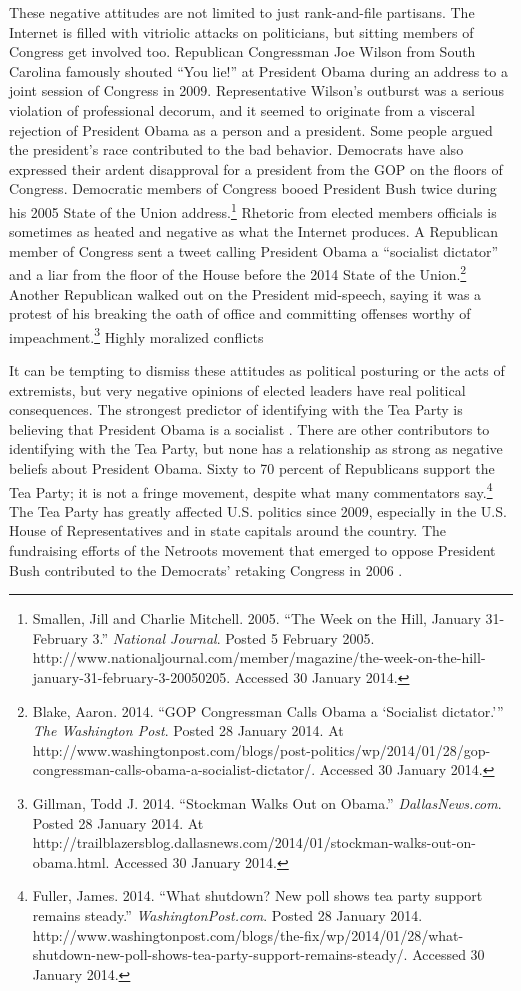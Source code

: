 These negative attitudes are not limited to just rank-and-file partisans. The Internet is filled with vitriolic attacks on politicians, but sitting members of Congress get involved too. Republican Congressman Joe Wilson from South Carolina famously shouted ``You lie!'' at President Obama during an address to a joint session of Congress in 2009. Representative Wilson's outburst was a serious violation of professional decorum, and it seemed to originate from a visceral rejection of President Obama as a person and a president. Some people argued the president's race contributed to the bad behavior. Democrats have also expressed their ardent disapproval for a president from the GOP on the floors of Congress. Democratic members of Congress booed President Bush twice during his 2005 State of the Union address.\footnote{Smallen, Jill and Charlie Mitchell. 2005. ``The Week on the Hill, January 31-February 3.'' \emph{National Journal}. Posted 5 February 2005. http://www.nationaljournal.com/member/magazine/the-week-on-the-hill-january-31-february-3-20050205. Accessed 30 January 2014.} Rhetoric from elected members officials is sometimes as heated and negative as what the Internet produces. A Republican member of Congress sent a tweet calling President Obama a ``socialist dictator'' and a liar from the floor of the House before the 2014 State of the Union.\footnote{Blake, Aaron. 2014. ``GOP Congressman Calls Obama a `Socialist dictator.''' \emph{The Washington Post}. Posted 28 January 2014. At http://www.washingtonpost.com/blogs/post-politics/wp/2014/01/28/gop-congressman-calls-obama-a-socialist-dictator/. Accessed 30 January 2014.} Another Republican walked out on the President mid-speech, saying it was a protest of his breaking the oath of office and committing offenses worthy of impeachment.\footnote{Gillman, Todd J. 2014. ``Stockman Walks Out on Obama.'' \emph{DallasNews.com}. Posted 28 January 2014. At http://trailblazersblog.dallasnews.com/2014/01/stockman-walks-out-on-obama.html. Accessed 30 January 2014.} Highly moralized conflicts

It can be tempting to dismiss these attitudes as political posturing or the acts of extremists, but very negative opinions of elected leaders have real political consequences. The strongest predictor of identifying with the Tea Party is believing that President Obama is a socialist \cite{ParkerBarreto2013}. There are other contributors to identifying with the Tea Party, but none has a relationship as strong as negative beliefs about President Obama. Sixty to 70 percent of Republicans support the Tea Party; it is not a fringe movement, despite what many commentators say.\footnote{Fuller, James. 2014. ``What shutdown? New poll shows tea party support remains steady.'' \emph{WashingtonPost.com}. Posted 28 January 2014. http://www.washingtonpost.com/blogs/the-fix/wp/2014/01/28/what-shutdown-new-poll-shows-tea-party-support-remains-steady/. Accessed 30 January 2014.} The Tea Party has greatly affected U.S. politics since 2009, especially in the U.S. House of Representatives and in state capitals around the country. The fundraising efforts of the Netroots movement that emerged to oppose President Bush contributed to the Democrats' retaking Congress in 2006 \cite{Karpf2013}.

